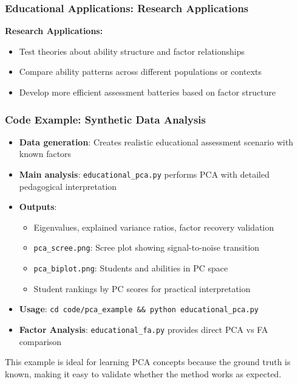 \documentclass[aspectratio=169]{beamer}
\begin{document}
\begin{frame}
    \frametitle{Educational Applications: Research Applications}
    \textbf{Research Applications:}
    \begin{itemize}
        \item Test theories about ability structure and factor relationships \pause
        \item Compare ability patterns across different populations or contexts \pause
        \item Develop more efficient assessment batteries based on factor structure \pause
    \end{itemize}
\end{frame}

\begin{frame}
    \frametitle{Code Example: Synthetic Data Analysis}
    \begin{itemize}
        \item \textbf{Data generation}: Creates realistic educational assessment scenario with known factors \pause
        \item \textbf{Main analysis}: \texttt{educational\_pca.py} performs PCA with detailed pedagogical interpretation \pause
        \item \textbf{Outputs}:
              \begin{itemize}
                  \item Eigenvalues, explained variance ratios, factor recovery validation \pause
                  \item \texttt{pca\_scree.png}: Scree plot showing signal-to-noise transition \pause
                  \item \texttt{pca\_biplot.png}: Students and abilities in PC space \pause
                  \item Student rankings by PC scores for practical interpretation \pause
              \end{itemize}
        \item \textbf{Usage}: \texttt{cd code/pca\_example \&\& python educational\_pca.py} \pause
        \item \textbf{Factor Analysis}: \texttt{educational\_fa.py} provides direct PCA vs FA comparison \pause
    \end{itemize}
    \vspace{6pt}
    This example is ideal for learning PCA concepts because the ground truth is known, making it easy to validate whether the method works as expected.
\end{frame}
\end{document}
